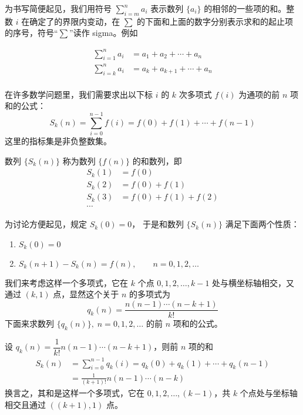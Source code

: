 {\linespread{1.65}\selectfont 为书写简便起见，我们用符号 $\sum\limits^n_{i=m}a_i$ 表示数列 $\{a_i\}$ 的相邻的一些项的和。整数 $i$ 在确定了的界限内变动，在 $\sum$ 的下面和上面的数字分别表示求和的起止项的序号，符号“$\sum$”读作 sigma。例如\par}
\[\begin{split}
    \sum^n_{i=1}a_i&=a_1+a_2+\cdots+a_n\\
    \sum^n_{i=k}a_i&=a_k+a_{k+1}+\cdots+a_n\\
\end{split}\]

在许多数学问题里，我们需要求出以下标 $i$ 的 $k$ 次多项式 $f(i)$ 为通项的前 $n$ 项和的公式：
\[S_k(n)=\sum^{n-1}_{i=0}f(i)=f(0)+f(1)+\cdots+f(n-1)\]
这里的指标集是非负整数集。

数列 $\{S_k(n)\}$ 称为数列 $\{f(n)\}$ 的和数列，即
\[\begin{split}
    S_k(1)&=f(0)\\
    S_k(2)&=f(0)+f(1)\\
    S_k(3)&=f(0)+f(1)+f(2)\\
    \cdots
\end{split}\]

为讨论方便起见，规定 $S_k(0)=0$， 于是和数列 $\{S_k(n)\}$ 满足下面两个性质：
\begin{enumerate}[itemindent=3.5em]
    \item $S_k(0)=0$
    \item $S_k(n+1)-S_k(n)=f(n),\qquad n=0,1,2,\ldots$
\end{enumerate}

我们来考虑这样一个多项式，它在 $k$ 个点 $0,1,2,\ldots,k-1$ 处与横坐标轴相交，又通过 $(k,1)$ 点，显然这个关于 $n$ 的多项式为
\[q_k(n)=\frac{n(n-1)\cdots(n-k+1)}{k!}\]
下面来求数列 $\{q_k(n)\},\; n=0,1,2,\ldots$ 的前 $n$ 项和的公式。

\begin{example}\label{exp:sum_of_qk}
设 $q_k(n)=\dfrac{1}{k!}n(n-1)\cdots(n-k+1)$，则前 $n$ 项的和
\[\begin{split}
    S_k(n)&=\sum^{n-1}_{i=0} q_k(i)=q_k(0)+q_k(1)+\cdots+q_k(n-1)\\
    &=\frac{1}{(k+1)!}n(n-1)\cdots(n-k)
\end{split}\]
换言之，其和是这样一个多项式，它在 $0,1,2,\ldots,(k-1)$，共 $k$ 个点处与坐标轴相交且通过 $((k+1),1)$ 点。
\end{example}

